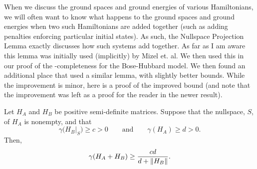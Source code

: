 \documentclass[../thesis-main/thesis-main]{subfiles}
\begin{document}
When we discuss the ground spaces and ground energies of various Hamiltonians, we will often want to know what happens to the ground spaces and ground energies when two such Hamiltonians are added together (such as adding penalties enforcing particular initial states).  As such, the Nullspace Projection Lemma exactly discusses how such systems add together.  As far as I am aware this lemma was initially used (implicitly) by Mizel et. al.  
We then used this in our proof of the \QMA-completeness for the Bose-Hubbard model.  We then found an additional place that used a similar lemma, with slightly better bounds.  While the improvement is minor, here is a proof of the improved bound (and note that the improvement was left as a proof for the reader in the newer result).
\begin{lemma}
Let $H_A$ and $H_B$ be positive semi-definite matrices.  Suppose that the nullspace, $S$, of $H_A$ is nonempty, and that 
\begin{equation}
  \gamma\big(H_B|_S\big) \geq c > 0 \qquad \text{and} \qquad \gamma(H_A) \geq d > 0.
\end{equation}
Then,
\begin{equation}
  \gamma(H_A + H_B) \geq \frac{c d}{d + \|{H_B}\|} .
\end{equation}
\label{lem:NPL}
\end{lemma}
\end{document}
